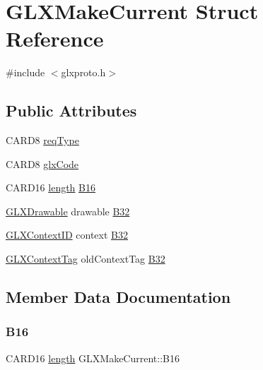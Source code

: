 \hypertarget{struct_g_l_x_make_current}{}\section{G\+L\+X\+Make\+Current Struct Reference}
\label{struct_g_l_x_make_current}


{\ttfamily \#include $<$glxproto.\+h$>$}

\subsection*{Public Attributes}
\begin{DoxyCompactItemize}
\item 
C\+A\+R\+D8 \hyperlink{struct_g_l_x_make_current_a8f947b2a1f3d666a669bfbf309ab3d2a}{req\+Type}
\item 
C\+A\+R\+D8 \hyperlink{struct_g_l_x_make_current_a45e5df71b53cbf640713ce6c09289548}{glx\+Code}
\item 
C\+A\+R\+D16 \hyperlink{glcorearb_8h_ab9c919755bde3b34349e23a32b4e0fa7}{length} \hyperlink{struct_g_l_x_make_current_ae6b125a4fcf89f06a9d7289d1cb07b85}{B16}
\item 
\hyperlink{glx_8h_a826f51745d9d6c81bdbac47ae2b80cf7}{G\+L\+X\+Drawable} drawable \hyperlink{struct_g_l_x_make_current_ab9cd8d0fb451453a88c7ad1bf685a5ed}{B32}
\item 
\hyperlink{glx_8h_a17c7ca5b76cc448032df0b5352803005}{G\+L\+X\+Context\+ID} context \hyperlink{struct_g_l_x_make_current_a9e54afac17f0e02f71c1257cf4f82fc7}{B32}
\item 
\hyperlink{glxproto_8h_ae71763ce00c9fa460beb4699af678691}{G\+L\+X\+Context\+Tag} old\+Context\+Tag \hyperlink{struct_g_l_x_make_current_aa25033d9b54ed04aae2886a5bbf5725c}{B32}
\end{DoxyCompactItemize}


\subsection{Member Data Documentation}
\mbox{\label{struct_g_l_x_make_current_ae6b125a4fcf89f06a9d7289d1cb07b85}} 
\subsubsection{\texorpdfstring{B16}{B16}}
{\footnotesize\ttfamily C\+A\+R\+D16 \hyperlink{glcorearb_8h_ab9c919755bde3b34349e23a32b4e0fa7}{length} G\+L\+X\+Make\+Current\+::\+B16}

